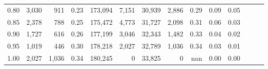 \begin{tabular}{rrrrrrrrrrrrrr}
0.80 &   3,030 &    911 &  0.23 &  173,094 &    7,151 &  30,939 &   2,886 &  0.29 &  0.09 &      0.05 \\
0.85 &   2,378 &    788 &  0.25 &  175,472 &    4,773 &  31,727 &   2,098 &  0.31 &  0.06 &      0.03 \\
0.90 &   1,727 &    616 &  0.26 &  177,199 &    3,046 &  32,343 &   1,482 &  0.33 &  0.04 &      0.02 \\
0.95 &   1,019 &    446 &  0.30 &  178,218 &    2,027 &  32,789 &   1,036 &  0.34 &  0.03 &      0.01 \\
1.00 &   2,027 &  1,036 &  0.34 &  180,245 &        0 &  33,825 &       0 &   nan &  0.00 &      0.00 \\
\bottomrule
\end{tabular}
